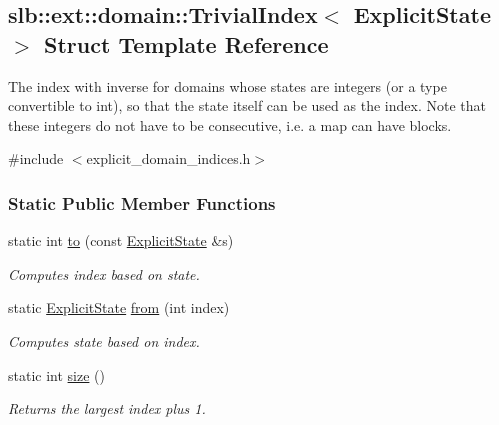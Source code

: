 \hypertarget{structslb_1_1ext_1_1domain_1_1TrivialIndex}{}\subsection{slb\+:\+:ext\+:\+:domain\+:\+:Trivial\+Index$<$ Explicit\+State $>$ Struct Template Reference}
\label{structslb_1_1ext_1_1domain_1_1TrivialIndex}


The index with inverse for domains whose states are integers (or a type convertible to int), so that the state itself can be used as the index. Note that these integers do not have to be consecutive, i.\+e. a map can have blocks.  




{\ttfamily \#include $<$explicit\+\_\+domain\+\_\+indices.\+h$>$}

\subsubsection*{Static Public Member Functions}
\begin{DoxyCompactItemize}
\item 
static int \hyperlink{structslb_1_1ext_1_1domain_1_1TrivialIndex_aaf8b23f12b9f0e902036b5f5debd9cb6}{to} (const \hyperlink{structslb_1_1core_1_1sb_1_1ExplicitState}{Explicit\+State} \&s)
\begin{DoxyCompactList}\small\item\em Computes index based on state. \end{DoxyCompactList}\item 
static \hyperlink{structslb_1_1core_1_1sb_1_1ExplicitState}{Explicit\+State} \hyperlink{structslb_1_1ext_1_1domain_1_1TrivialIndex_a893a49225b826a4dcd55a582594f3211}{from} (int index)
\begin{DoxyCompactList}\small\item\em Computes state based on index. \end{DoxyCompactList}\item 
static int \hyperlink{structslb_1_1ext_1_1domain_1_1TrivialIndex_a6f85550616eddda8b3477283faf0598a}{size} ()
\begin{DoxyCompactList}\small\item\em Returns the largest index plus 1. \end{DoxyCompactList}\end{DoxyCompactItemize}
